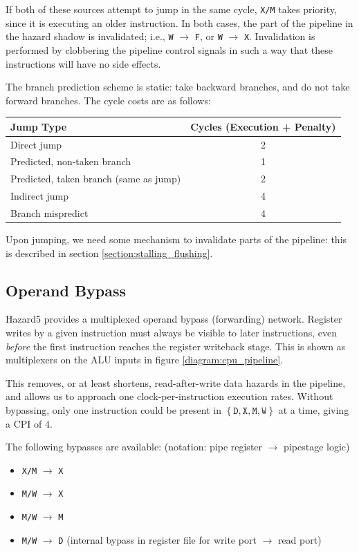 \documentclass{article}
\begin{document}
If both of these sources attempt to jump in the same cycle, \texttt{X/M} takes priority, since it is executing an older instruction. In both cases, the part of the pipeline in the hazard shadow is invalidated; i.e., \texttt{W} $\to$ \texttt{F}, or \texttt{W} $\to$ \texttt{X}. Invalidation is performed by clobbering the pipeline control signals in such a way that these instructions will have no side effects.

The branch prediction scheme is static: take backward branches, and do not take forward branches. The cycle costs are as follows:

\begin{center}
\begin{tabular}{l c}
\hline
Jump Type & Cycles (Execution + Penalty) \\
\hline
Direct jump & 2 \\
Predicted, non-taken branch & 1 \\
Predicted, taken branch (same as jump) & 2 \\
Indirect jump & 4 \\
Branch mispredict & 4 \\
\hline
\end{tabular}
\end{center}

Upon jumping, we need some mechanism to invalidate parts of the pipeline: this is described in section \ref{section:stalling_flushing}.

\subsection{Operand Bypass}

Hazard5 provides a multiplexed operand bypass (forwarding) network. Register writes by a given instruction must always be visible to later instructions, even \textit{before} the first instruction reaches the register writeback stage. This is shown as multiplexers on the ALU inputs in figure \ref{diagram:cpu_pipeline}.

This removes, or at least shortens, read-after-write data hazards in the pipeline, and allows us to approach one clock-per-instruction execution rates. Without bypassing, only one instruction could be present in $\left\{ \texttt{D}, \texttt{X}, \texttt{M}, \texttt{W} \right\}$ at a time, giving a CPI of 4.

The following bypasses are available: (notation: pipe register $\to$ pipestage logic)

\begin{itemize}
	\item \texttt{X/M} $\to$ \texttt{X}
	\item \texttt{M/W} $\to$ \texttt{X}
	\item \texttt{M/W} $\to$ \texttt{M}
	\item \texttt{M/W} $\to$ \texttt{D} (internal bypass in register file for write port $\to$ read port)
\end{itemize}
\end{document}
